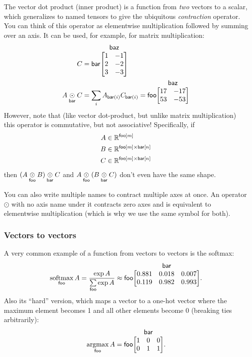\documentclass{article}
\makeatletter
\newcommand{\nmatrix}[3]{\name{#1}\begin{array}[b]{@{}c@{}}\name{#2}\\\begin{bmatrix}#3\end{bmatrix}\end{array}}
\makeatother
\begin{document}
The vector dot product (inner product) is a function from \emph{two} vectors to a scalar, which generalizes to named tensors to give the ubiquitous \emph{contraction} operator. You can think of this operator as elementwise multiplication followed by summing over an axis. It can be used, for example, for matrix multiplication:
\begin{align*}
C &= \nmatrix{bar}{baz}{
  1 & -1 \\ 2 & -2 \\ 3 & -3
} \\
A \ndot{bar} C &= \sum_i A_{\nidx{bar}{i}} C_{\nidx{bar}{i}} = \nmatrix{foo}{baz}{
  17 & -17 \\
  53 & -53
}
\end{align*}
However, note that (like vector dot-product, but unlike matrix multiplication) this operator is commutative, but not associative! Specifically, if
\begin{align*}
A &\in \mathbb{R}^{\mathsf{foo}[m]} \\
B &\in \mathbb{R}^{\mathsf{foo}[m] \times\mathsf{bar}[n]} \\
C &\in \mathbb{R}^{\mathsf{foo}[m] \times\mathsf{bar}[n]}
\end{align*}
then $(A \mathbin{\underset{\mathsf{foo}}{\odot}} B) \mathbin{\underset{\mathsf{bar}}{\odot}} C$ and $A \mathbin{\underset{\mathsf{foo}}{\odot}} (B \mathbin{\underset{\mathsf{bar}}{\odot}} C)$ don't even have the same shape.

You can also write multiple names to contract multiple axes at once. An operator $\odot$ with no axis name under it contracts zero axes and is equivalent to elementwise multiplication (which is why we use the same symbol for both).

\subsubsection{Vectors to vectors}

A very common example of a function from vectors to vectors is the softmax:
\begin{equation*}
  \nfun{foo}{softmax} A = \frac{\exp A}{\nsum{foo} \exp A} \approx \nmatrix{foo}{bar}{
    0.881 & 0.018 & 0.007 \\
    0.119 & 0.982 & 0.993
  }.
\end{equation*}
Also its ``hard'' version, which maps a vector to a one-hot vector where the maximum element becomes 1 and all other elements become 0 (breaking ties arbitrarily):
\begin{equation*}
  \nfun{foo}{argmax} A = \nmatrix{foo}{bar}{
    1 & 0 & 0 \\
    0 & 1 & 1
  }.
\end{equation*}
\end{document}
